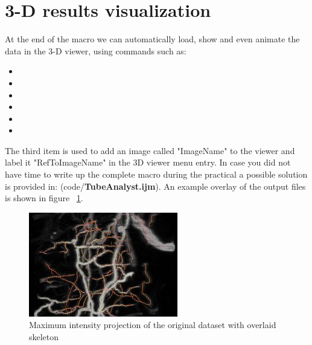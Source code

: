 \section{3-D results visualization}
%
At the end of the macro we can automatically load, show and even animate the data in the 3-D viewer, using commands such as:
\begin{itemize}
\item {}
\item {}
\item {}
\item {}
\item {}
\item {}
\end{itemize}
The third item is used to add an image called "ImageName" to the viewer and label it "RefToImageName" in the 3D viewer  menu entry.
%
In case you did not have time to write up the complete macro during the practical a possible solution is provided in: (code/\textbf{TubeAnalyst.ijm}). An example overlay of the output files is shown in figure ~\ref{fig:bloodvesselsproj}.

\begin{figure}
  \caption{Maximum intensity projection of the original dataset with overlaid skeleton} 
  \label{fig:bloodvesselsproj}
  \centering
    \includegraphics[scale=1]{fig/Projection.png}
\end{figure}



